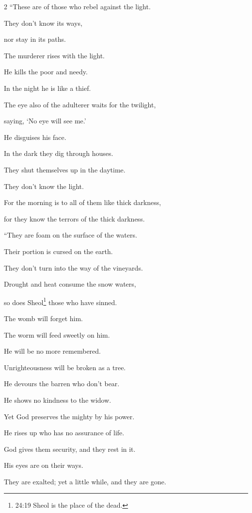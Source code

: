 \begin{multicols}{2}
	\myverse{}“These are of those who rebel against the light.
	
	They don’t know its ways,
	
	nor stay in its paths.
	
	\myverse{}The murderer rises with the light.
	
	He kills the poor and needy.
	
	In the night he is like a thief.
	
	\myverse{}The eye also of the adulterer waits for the twilight,
	
	saying, ‘No eye will see me.’
	
	He disguises his face.
	
	\myverse{}In the dark they dig through houses.
	
	They shut themselves up in the daytime.
	
	They don’t know the light.
	
	\myverse{}For the morning is to all of them like thick darkness,
	
	for they know the terrors of the thick darkness.
	
	\vspace{\baselineskip}
	
	\myverse{}“They are foam on the surface of the waters.
	
	Their portion is cursed on the earth.
	
	They don’t turn into the way of the vineyards.
	
	\myverse{}Drought and heat consume the snow waters,
	
	so does Sheol\footnote{24:19 Sheol is the place of the dead.} those who have sinned.
	
	\myverse{}The womb will forget him.
	
	The worm will feed sweetly on him.
	
	He will be no more remembered.
	
	Unrighteousness will be broken as a tree.
	
	\myverse{}He devours the barren who don’t bear.
	
	He shows no kindness to the widow.
	
	\myverse{}Yet God preserves the mighty by his power.
	
	He rises up who has no assurance of life.
	
	\myverse{}God gives them security, and they rest in it.
	
	His eyes are on their ways.
	
	\myverse{}They are exalted; yet a little while, and they are gone.
	

\end{multicols}
